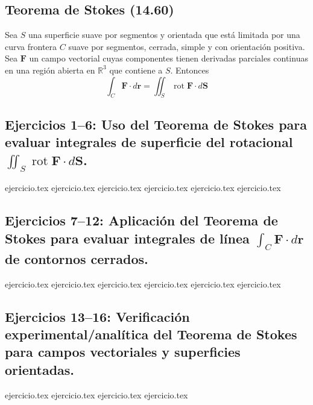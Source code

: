 \subsection*{Teorema de Stokes (14.60)}
Sea $S$ una superficie suave por segmentos y orientada que está limitada por una curva frontera $C$ suave por segmentos, cerrada, simple y con orientación positiva. Sea $\mathbf{F}$ un campo vectorial cuyas componentes tienen derivadas parciales continuas en una región abierta en $\mathbb{R}^3$ que contiene a $S$. Entonces
\[ \int_C \mathbf{F} \cdot d\mathbf{r} = \iint_S \operatorname{rot} \mathbf{F} \cdot d\mathbf{S} \]

\bigskip

\subsection*{Ejercicios 1--6: Uso del Teorema de Stokes para evaluar integrales de superficie del rotacional $\iint_S \operatorname{rot} \mathbf{F} \cdot d\mathbf{S}$.}
\begin{enumerate}
    {ejercicio.tex}
    {ejercicio.tex}
    {ejercicio.tex}
    {ejercicio.tex}
    {ejercicio.tex}
    {ejercicio.tex}
\end{enumerate}

\subsection*{Ejercicios 7--12: Aplicación del Teorema de Stokes para evaluar integrales de línea $\int_C \mathbf{F} \cdot d\mathbf{r}$ de contornos cerrados.}
\begin{enumerate}
    \setcounter{enumi}{6}
    {ejercicio.tex}
    {ejercicio.tex}
    {ejercicio.tex}
    {ejercicio.tex}
    {ejercicio.tex}
    {ejercicio.tex}
\end{enumerate}

\subsection*{Ejercicios 13--16: Verificación experimental/analítica del Teorema de Stokes para campos vectoriales y superficies orientadas.}
\begin{enumerate}
    \setcounter{enumi}{12}
    {ejercicio.tex}
    {ejercicio.tex}
    {ejercicio.tex}
    {ejercicio.tex}
\end{enumerate}

